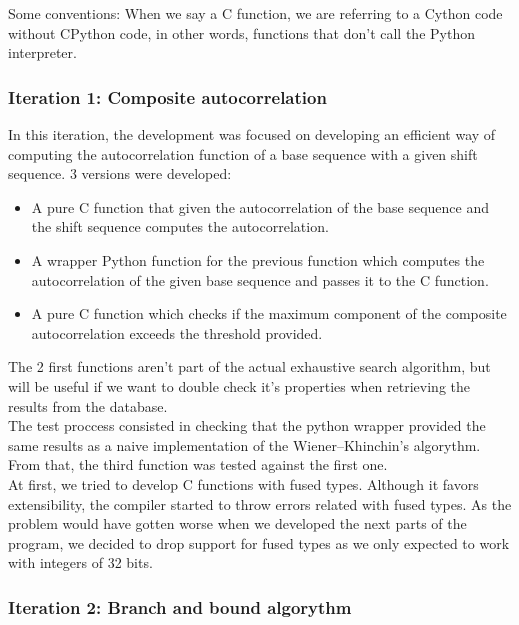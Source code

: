       Some conventions: When we say a C function, we are referring to a Cython
      code without CPython code, in other words, functions that don't call
      the Python interpreter.

      \subsubsection{Iteration 1: Composite autocorrelation}

      In this iteration, the development was focused on developing an efficient
      way of computing the autocorrelation function of a base sequence with a
      given shift sequence. 3 versions were developed:
      \begin{itemize}
        \item A pure C function that given the autocorrelation of the base
        sequence and the shift sequence computes the autocorrelation.
        \item A wrapper Python function for the previous function which
        computes the autocorrelation of the given base sequence and passes it
        to the C function.
        \item A pure C function which checks if the maximum component of the
        composite autocorrelation exceeds the threshold provided.
      \end{itemize}

      The 2 first functions aren't part of the actual exhaustive search
      algorithm, but will be useful if we want to double check it's properties
      when retrieving the results from the database. \\

      The test proccess consisted in checking that the python wrapper provided
      the same results as a naive implementation of the Wiener–Khinchin's
      algorythm. From that, the third function was tested against the first
      one.\\

      At first, we tried to develop C functions with fused types. Although it
      favors extensibility, the compiler started to throw errors related with
      fused types. As the problem would have gotten worse when we developed the
      next parts of the program, we decided to drop support for fused types as
      we only expected to work with integers of 32 bits.\\

      \subsubsection{Iteration 2: Branch and bound algorythm}

